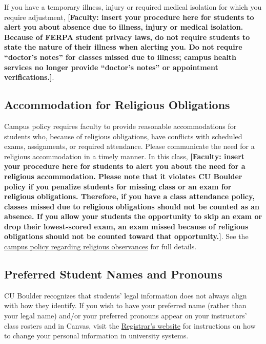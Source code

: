 If you have a temporary illness, injury or required medical isolation for which you require adjustment, \textbf{[Faculty: insert your procedure here for students to alert you about absence due to illness, injury or medical isolation. Because of FERPA student privacy laws, do not require students to state the nature of their illness when alerting you. Do not require ``doctor's notes'' for classes missed due to illness; campus health services no longer provide ``doctor's notes'' or appointment verifications.]}.

\subsection*{Accommodation for Religious Obligations}

Campus policy requires faculty to provide reasonable accommodations for students who, because of religious obligations, have conflicts with scheduled exams, assignments, or required attendance. Please communicate the need for a religious accommodation in a timely manner. In this class, \textbf{[Faculty: insert your procedure here for students to alert you about the need for a religious accommodation. Please note that it violates CU Boulder policy if you penalize students for missing class or an exam for religious obligations. Therefore, if you have a class attendance policy, classes missed due to religious obligations should not be counted as an absence. If you allow your students the opportunity to skip an exam or drop their lowest-scored exam, an exam missed because of religious obligations should not be counted toward that opportunity.]}. See the \href{https://www.colorado.edu/compliance/policies/observance-religious-holidays-absences-classes-or-exams}{campus policy regarding religious observances} for full details.

\subsection*{Preferred Student Names and Pronouns}

CU Boulder recognizes that students' legal information does not always align with how they identify. If you wish to have your preferred name (rather than your legal name) and/or your preferred pronouns appear on your instructors' class rosters and in Canvas, visit the \href{https://www.colorado.edu/registrar/students/records/info/preferred}{Registrar's website} for instructions on how to change your personal information in university systems.

